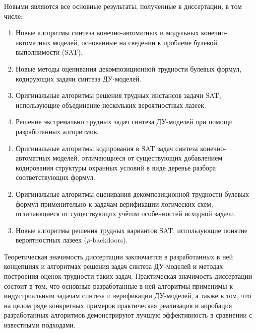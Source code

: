 {\novelty}
Новыми являются все основные результаты, полученные в диссертации, в том числе:
\begin{enumerate}[beginpenalty=10000]
    \item Новые алгоритмы синтеза конечно-автоматных и модульных конечно-автоматных моделей, основанные на сведении к проблеме булевой выполнимости (SAT).

    \item Новые методы оценивания декомпозиционной трудности булевых формул, кодирующих задачи синтеза ДУ-моделей.

    \item Оригинальные алгоритмы решения трудных инстансов задачи SAT, использующие объединение нескольких вероятностных лазеек.

    \item Решение экстремально трудных задач синтеза ДУ-моделей при помощи разработанных алгоритмов.
\end{enumerate}


\begin{enumerate}[beginpenalty=10000]
    \item Оригинальные алгоритмы кодирования в SAT задач синтеза конечно-автоматных моделей, отличающиеся от существующих добавлением кодирования структуры охранных условий в виде деревье разбора соответствующих формул.

    \item Оригинальные алгоритмы оценивания декомпозиционной трудности булевых формул применительно к задачам верификации логических схем, отличающиеся от существующих учётом особенностей исходной задачи.

    \item Новые алгоритмы решения трудных вариантов SAT, использующие понятие вероятностных лазеек ($\rho$-backdoors).


\end{enumerate}


\influence
Теоретическая значимость диссертации заключается в разработанных в ней концепциях и алгоритмах решения задач синтеза ДУ-моделей и методах построения оценок трудности таких задач.
Практическая значимость диссертации состоит в том, что основные разработанные в ней алгоритмы применимы к индустриальным задачам синтеза и верификации ДУ-моделей, а также в том, что на целом ряде конкретных примеров практическая реализация и апробация разработанных  алгоритмов демонстрируют лучшую эффективность в сравнении с известными подходами.


